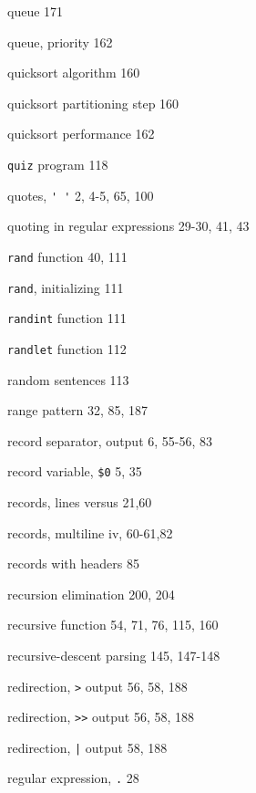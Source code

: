 \begin{multicols}{3}
\hangindent=3pc  queue 171

\hangindent=3pc  queue, priority 162

\hangindent=3pc  quicksort algorithm 160

\hangindent=3pc  quicksort partitioning step 160

\hangindent=3pc  quicksort performance 162

\hangindent=3pc  \verb'quiz' program 118

\hangindent=3pc  quotes, \verb"' '" 2, 4-5, 65, 100

\hangindent=3pc  quoting in regular expressions 29-30, 41, 43

\hangindent=3pc  \verb'rand' function 40, 111

\hangindent=3pc  \verb'rand', initializing 111

\hangindent=3pc  \verb'randint' function 111

\hangindent=3pc  \verb'randlet' function 112

\hangindent=3pc  random sentences 113

\hangindent=3pc  range pattern 32, 85, 187

\hangindent=3pc  record separator, output 6, 55-56, 83

\hangindent=3pc  record variable, \verb'$0' 5, 35

\hangindent=3pc  records, lines versus 21,60

\hangindent=3pc  records, multiline iv, 60-61,82

\hangindent=3pc  records with headers 85

\hangindent=3pc  recursion elimination 200, 204

\hangindent=3pc  recursive function 54, 71, 76, 115, 160

\hangindent=3pc  recursive-descent parsing 145, 147-148

\hangindent=3pc  redirection, \verb'>' output 56, 58, 188

\hangindent=3pc  redirection, \verb'>>' output 56, 58, 188

\hangindent=3pc  redirection, \verb'|' output 58, 188

\hangindent=3pc  regular expression, \verb'.' 28


\end{multicols}
